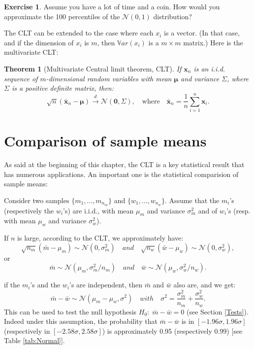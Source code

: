 \documentclass[
  12pt,
]{book}
\newtheorem{theorem}{Theorem}[chapter]
\theoremstyle{definition}
\theoremstyle{definition}
\theoremstyle{definition}
\newtheorem{exercise}{Exercise}[chapter]
\theoremstyle{definition}
\theoremstyle{remark}
\begin{document}
\begin{exercise}
\protect\hypertarget{exr:ExoPileFace}{}\label{exr:ExoPileFace}Assume you have a lot of time and a coin. How would you approximate the 100 percentiles of the \(\mathcal{N}(0,1)\) distribution?
\end{exercise}

The CLT can be extended to the case where each \(x_i\) is a vector. (In that case, and if the dimension of \(x_i\) is \(m\), then \(\mathbb{V}ar(x_i)\) is a \(m\times m\) matrix.) Here is the multivariate CLT:

\begin{theorem}[Multivariate Central limit theorem, CLT]
\protect\hypertarget{thm:MCLT}{}\label{thm:MCLT}If \(\mathbf{x}_n\) is an i.i.d. sequence of \(m\)-dimensional random variables with mean \(\boldsymbol\mu\) and variance \(\Sigma\), where \(\Sigma\) is a positive definite matrix, then:
\[
\boxed{\sqrt{n} (\bar{\mathbf{x}}_n - \boldsymbol\mu) \overset{d}{\rightarrow} \mathcal{N}(\mathbf{0},\Sigma), \quad \mbox{where} \quad \bar{\mathbf{x}}_n = \frac{1}{n} \sum_{i=1}^{n} \mathbf{x}_i.}
\]
\end{theorem}

\hypertarget{comparison-of-sample-means}{%
\section{Comparison of sample means}\label{comparison-of-sample-means}}

As said at the beginning of this chapter, the CLT is a key statistical result that has numerous applications. An important one is the statistical comparision of sample means:

Consider two samples \(\{m_1,\dots,m_{n_m}\}\) and \(\{w_1,\dots,w_{n_w}\}\). Assume that the \(m_i\)'s (respectively the \(w_i\)'s) are i.i.d., with mean \(\mu_m\) and variance \(\sigma^2_m\) and of \(w_i\)'s (resp. with mean \(\mu_w\) and variance \(\sigma^2_w\)).

If \(n\) is large, according to the CLT, we approximately have:
\[
\sqrt{n_m}(\bar{m} - \mu_m) \sim \mathcal{N}(0,\sigma^2_m) \quad and \quad \sqrt{n_w}(\bar{w} - \mu_w) \sim \mathcal{N}(0,\sigma^2_w),
\]
or
\[
\bar{m} \sim \mathcal{N}(\mu_m,\sigma^2_m/n_m) \quad and \quad \bar{w} \sim \mathcal{N}(\mu_w,\sigma^2_w/n_w).
\]

if the \(m_i\)'s and the \(w_i\)'s are independent, then \(\bar{m}\) and \(\bar{w}\) also are, and we get:
\[
\bar{m} - \bar{w} \sim \mathcal{N}\left(\mu_m-\mu_w,\sigma^2\right) \quad with \quad \sigma^2 = \frac{\sigma^2_m}{n_m}+\frac{\sigma^2_w}{n_w}.
\]
This can be used to test the null hypothesis \(H_0: \; \bar{m} - \bar{w} = 0\) (see Section \ref{Tests}). Indeed under this assumption, the probability that \(\bar{m} - \bar{w}\) is in \([-1.96\sigma,1.96\sigma]\) (respectively in \([-2.58\sigma,2.58\sigma]\)) is approximately 0.95 (respectively 0.99) {[}see Table \ref{tab:Normal}{]}.
\end{document}
